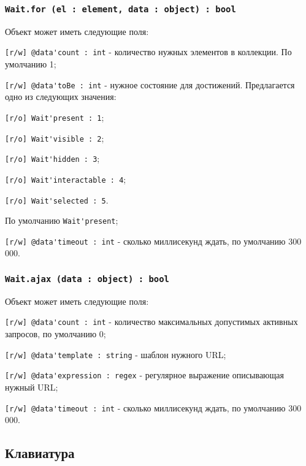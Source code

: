 \subsubsection{\lstinline|Wait.for (el : element, data : object) : bool|}

Объект  может иметь следующие поля:
\begin{icItems}
	\item \lstinline|[r/w] @data'count : int| - количество нужных элементов в коллекции. По умолчанию 1;
	\item \lstinline|[r/w] @data'toBe : int| - нужное состояние для достижений. Предлагается одно из следующих значения:
	\begin{icItems}
		\item \lstinline|[r/o] Wait'present : 1|;
		\item \lstinline|[r/o] Wait'visible : 2|;
		\item \lstinline|[r/o] Wait'hidden : 3|;
		\item \lstinline|[r/o] Wait'interactable : 4|;
		\item \lstinline|[r/o] Wait'selected : 5|.
	\end{icItems}
	По умолчанию \lstinline|Wait'present|;
	\item \lstinline|[r/w] @data'timeout : int| - сколько миллисекунд ждать, по умолчанию 300 000.
\end{icItems}

\subsubsection{\lstinline|Wait.ajax (data : object) : bool|}

Объект  может иметь следующие поля:
\begin{icItems}
	\item \lstinline|[r/w] @data'count : int| - количество максимальных допустимых активных запросов, по умолчанию 0;
	\item \lstinline|[r/w] @data'template : string| - шаблон нужного URL;
	\item \lstinline|[r/w] @data'expression : regex| - регулярное выражение описывающая нужный URL;
	\item \lstinline|[r/w] @data'timeout : int| - сколько миллисекунд ждать, по умолчанию 300 000.
\end{icItems}

\subsection{Клавиатура}

